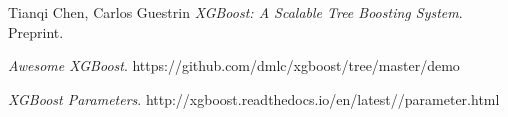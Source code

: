 \documentclass{article}
\begin{document}
\begin{spacing}{1.5}
\begin{large}
\begin{thebibliography}{9}

  Tianqi Chen, Carlos Guestrin
  \emph{XGBoost: A Scalable Tree Boosting System}. Preprint.

  \emph{Awesome XGBoost}.
  https://github.com/dmlc/xgboost/tree/master/demo
  
  \emph{XGBoost Parameters}.
  http://xgboost.readthedocs.io/en/latest//parameter.html



\end{thebibliography}


\end{large}
\end{spacing}
\end{document}
